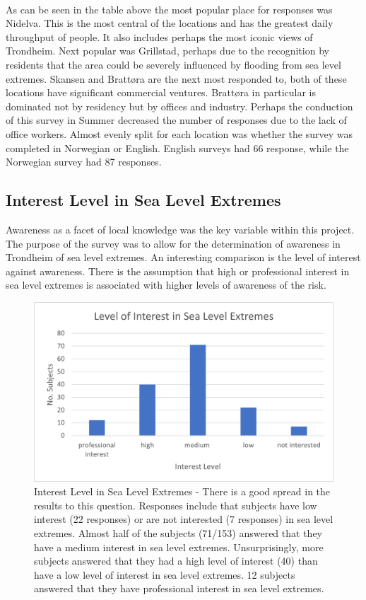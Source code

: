 \paragraph{}

As can be seen in the table above the most popular place for responses was Nidelva. This is the most central of the locations and has the greatest daily throughput of people. It also includes perhaps the most iconic views of Trondheim. Next popular was Grillstad, perhaps due to the recognition by residents that the area could be severely influenced by flooding from sea level extremes. Skansen and Brattøra are the next most responded to, both of these locations have significant commercial ventures. Brattøra in particular is dominated not by residency but by offices and industry. Perhaps the conduction of this survey in Summer decreased the number of responses due to the lack of office workers. Almost evenly split for each location was whether the survey was completed in Norwegian or English. English surveys had 66 response, while the Norwegian survey had 87 responses.  

\subsection{Interest Level in Sea Level Extremes}
Awareness as a facet of local knowledge was the key variable within this project. The purpose of the survey was to allow for the determination of awareness in Trondheim of sea level extremes. An interesting comparison is the level of interest against awareness. There is the assumption that high or professional interest in sea level extremes is associated with higher levels of awareness of the risk. 
\begin{figure}[h!]
    \centering
    \includegraphics{fig_results/interest-level.png}
    \caption{Interest Level in Sea Level Extremes - There is a good spread in the results to this question. Responses include that subjects have low interest (22 responses) or are not interested (7 responses) in sea level extremes. Almost half of the subjects (71/153) answered that they have a medium interest in sea level extremes. Unsurprisingly, more subjects answered that they had a high level of interest (40) than have a low level of interest in sea level extremes. 12 subjects answered that they have professional interest in sea level extremes. }
    \label{fig:my_interest_level}
\end{figure}
